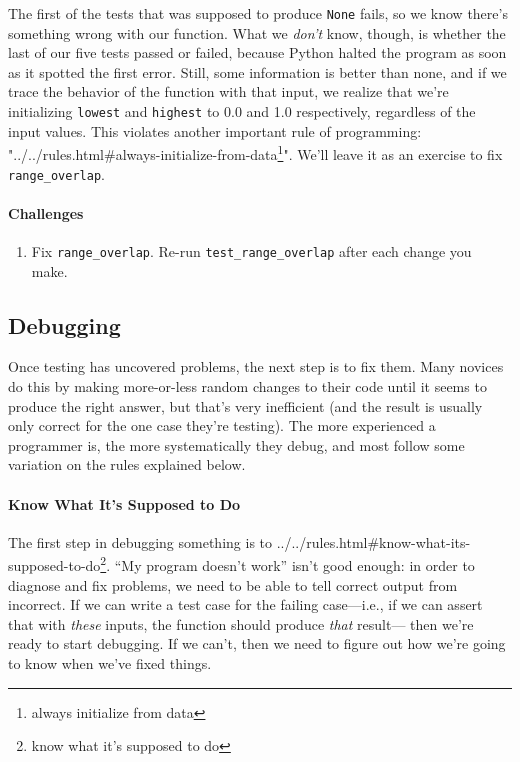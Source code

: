 \documentclass[]{book}
\newcommand{\urlfoot}[2]{{#1}\footnote{#2}}
\begin{document}
The first of the tests that was supposed to produce \texttt{None} fails,
so we know there's something wrong with our function. What we
\emph{don't} know, though, is whether the last of our five tests passed
or failed, because Python halted the program as soon as it spotted the
first error. Still, some information is better than none, and if we
trace the behavior of the function with that input, we realize that
we're initializing \texttt{lowest} and \texttt{highest} to 0.0 and 1.0
respectively, regardless of the input values. This violates another
important rule of programming:
"\urlfoot{../../rules.html\#always-initialize-from-data}{always initialize
from data}". We'll leave it as an exercise to fix
\texttt{range\_overlap}.

\mbox{}\paragraph{Challenges}

\begin{enumerate}
\item
  Fix \texttt{range\_overlap}. Re-run \texttt{test\_range\_overlap}
  after each change you make.
\end{enumerate}

\subsection{Debugging}

Once testing has uncovered problems, the next step is to fix them. Many
novices do this by making more-or-less random changes to their code
until it seems to produce the right answer, but that's very inefficient
(and the result is usually only correct for the one case they're
testing). The more experienced a programmer is, the more systematically
they debug, and most follow some variation on the rules explained below.

\mbox{}\paragraph{Know What It's Supposed to Do}

The first step in debugging something is to
\urlfoot{../../rules.html\#know-what-its-supposed-to-do}{know what it's
supposed to do}. ``My program doesn't work'' isn't good enough: in order
to diagnose and fix problems, we need to be able to tell correct output
from incorrect. If we can write a test case for the failing case---i.e.,
if we can assert that with \emph{these} inputs, the function should
produce \emph{that} result--- then we're ready to start debugging. If we
can't, then we need to figure out how we're going to know when we've
fixed things.
\end{document}
